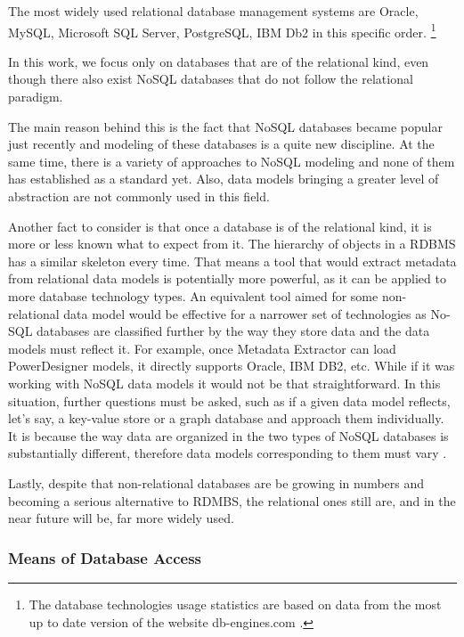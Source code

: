The most widely used relational database management systems are Oracle, MySQL, Microsoft SQL Server, PostgreSQL, IBM Db2 in this specific order. \footnote{The database technologies usage statistics are based on data from the most up to date version of the website db-engines.com \cite{DatabaseEnginesStatistics19}.}

In this work, we focus only on databases that are of the relational kind, even though there also exist NoSQL databases that do not follow the relational paradigm. 

The main reason behind this is the fact that NoSQL databases became popular just recently and modeling of these databases is a quite new discipline. At the same time, there is a variety of approaches to NoSQL modeling and none of them has established as a standard yet.
Also, data models bringing a greater level of abstraction are not commonly used in this field.

Another fact to consider is that once a database is of the relational kind, it is more or less known what to expect from it.
The hierarchy of objects in a RDBMS has a similar skeleton every time. 
That means a tool that would extract metadata from relational data models is potentially more powerful, as it can be applied to more database technology types.
An equivalent tool aimed for some non-relational data model would be effective for a narrower set of technologies as No-SQL databases are classified further by the way they store data and the data models must reflect it.
For example, once Metadata Extractor can load PowerDesigner models, it directly supports Oracle, IBM DB2, etc.
While if it was working with NoSQL data models it would not be that straightforward. In this situation, further questions must be asked, such as if a given data model reflects, let's say, a key-value store or a graph database and approach them individually. It is because the way data are organized in the two types of NoSQL databases is substantially different, therefore data models corresponding to them must vary \cite{NoSQLDatabaseModeling}.

Lastly, despite that non-relational databases are be growing in numbers and becoming a serious alternative to RDMBS, the relational ones still are, and in the near future will be, far more widely used.

\subsubsection{Means of Database Access}


